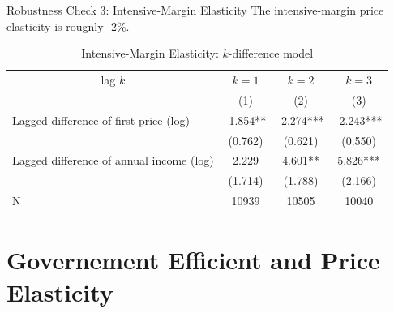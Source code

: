 \documentclass[
  ignorenonframetext,
]{beamer}
\begin{document}
\begin{frame}{Robustness Check 3: Intensive-Margin Elasticity}
\protect\hypertarget{robustness-check-3-intensive-margin-elasticity}{}
The intensive-margin price elasticity is rougnly -2\%.

\begin{table}

\caption{\label{tab:kablekDiffElasticitySlide2}Intensive-Margin Elasticity: $k$-difference model}
\centering
\fontsize{8}{10}\selectfont
\begin{tabular}[t]{lccc}
\toprule
\multicolumn{1}{c}{lag $k$} & \multicolumn{1}{c}{$k = 1$} & \multicolumn{1}{c}{$k = 2$} & \multicolumn{1}{c}{$k = 3$} \\
\cmidrule(l{3pt}r{3pt}){1-1} \cmidrule(l{3pt}r{3pt}){2-2} \cmidrule(l{3pt}r{3pt}){3-3} \cmidrule(l{3pt}r{3pt}){4-4}
 & (1) & (2) & (3)\\
\midrule
Lagged difference of first price (log) & -1.854** & -2.274*** & -2.243***\\
 & (0.762) & (0.621) & (0.550)\\
Lagged difference of annual income (log) & 2.229 & 4.601** & 5.826***\\
 & (1.714) & (1.788) & (2.166)\\
N & 10939 & 10505 & 10040\\
\bottomrule
\end{tabular}
\end{table}
\end{frame}

\hypertarget{governement-efficient-and-price-elasticity}{%
\section{Governement Efficient and Price Elasticity}\label{governement-efficient-and-price-elasticity}}
\end{document}
